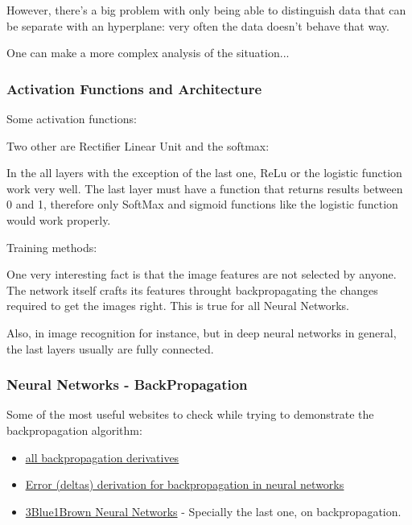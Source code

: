 
However, there's a big problem with only being able to distinguish data that can be separate with an hyperplane: very often the data doesn't behave that way.


One can make a more complex analysis of the situation...



\subsubsection*{Activation Functions and Architecture}

Some activation functions: 


Two other are Rectifier Linear Unit and the softmax:



In the all layers with the exception of the last one, ReLu or the logistic function work very well. The last layer must have a function that returns results between 0 and 1, therefore only SoftMax and sigmoid functions like the logistic function would work properly.





Training methods:



One very interesting fact is that the image features are not selected by anyone. The network itself crafts its features throught backpropagating the changes required to get the images right. This is true for all Neural Networks.

Also, in image recognition for instance, but in deep neural networks in general, the last layers usually are fully connected.

\subsubsection{Neural Networks - BackPropagation}

Some of the most useful websites to check while trying to demonstrate the backpropagation algorithm:
\begin{itemize}
    \item \href{https://medium.com/@pdquant/all-the-backpropagation-derivatives-d5275f727f60}{\ul{all backpropagation derivatives}}
    \item \href{https://stats.stackexchange.com/questions/94387/how-to-derive-errors-in-neural-network-with-the-backpropagation-algorithm}{\ul{Error (deltas) derivation for backpropagation in neural networks}}
    \item \href{https://www.youtube.com/playlist?list=PLZHQObOWTQDNU6R1_67000Dx_ZCJB-3pi}{3Blue1Brown Neural Networks} - Specially the last one, on backpropagation.
\end{itemize}

